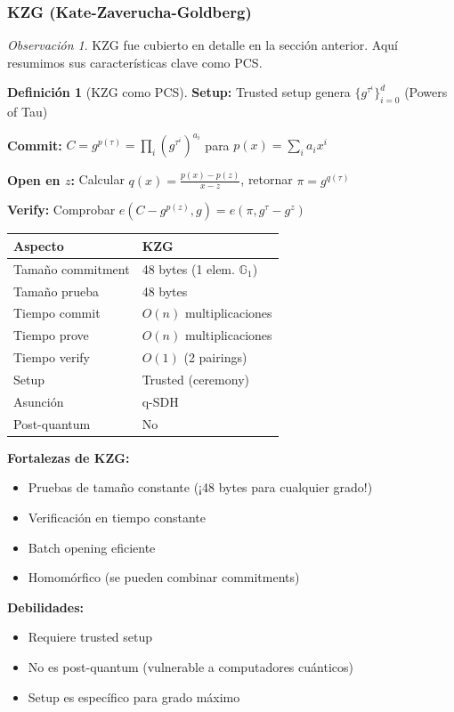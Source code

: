 \documentclass[11pt,a4paper,twoside,openright]{book}
\theoremstyle{definition}
\newtheorem{definition}{Definición}[chapter]
\theoremstyle{plain}
\theoremstyle{remark}
\newtheorem{remark}{Observación}[chapter]
\begin{document}
\subsubsection{KZG (Kate-Zaverucha-Goldberg)}

\begin{remark}
KZG fue cubierto en detalle en la sección anterior. Aquí resumimos sus características clave como PCS.
\end{remark}

\begin{definition}[KZG como PCS]
\textbf{Setup:} Trusted setup genera $\{g^{\tau^i}\}_{i=0}^d$ (Powers of Tau)

\textbf{Commit:} $C = g^{p(\tau)} = \prod_i (g^{\tau^i})^{a_i}$ para $p(x) = \sum_i a_i x^i$

\textbf{Open en $z$:} Calcular $q(x) = \frac{p(x) - p(z)}{x - z}$, retornar $\pi = g^{q(\tau)}$

\textbf{Verify:} Comprobar $e(C - g^{p(z)}, g) = e(\pi, g^\tau - g^z)$
\end{definition}

\begin{center}
\begin{tabular}{ll}
\toprule
\textbf{Aspecto} & \textbf{KZG} \\
\midrule
Tamaño commitment & 48 bytes (1 elem. $\mathbb{G}_1$) \\
Tamaño prueba & 48 bytes \\
Tiempo commit & $O(n)$ multiplicaciones \\
Tiempo prove & $O(n)$ multiplicaciones \\
Tiempo verify & $O(1)$ (2 pairings) \\
Setup & Trusted (ceremony) \\
Asunción & q-SDH \\
Post-quantum & No \\
\bottomrule
\end{tabular}
\end{center}

\begin{keyidea}
\textbf{Fortalezas de KZG:}
\begin{itemize}
    \item Pruebas de tamaño constante (¡48 bytes para cualquier grado!)
    \item Verificación en tiempo constante
    \item Batch opening eficiente
    \item Homomórfico (se pueden combinar commitments)
\end{itemize}

\textbf{Debilidades:}
\begin{itemize}
    \item Requiere trusted setup
    \item No es post-quantum (vulnerable a computadores cuánticos)
    \item Setup es específico para grado máximo
\end{itemize}
\end{keyidea}
\end{document}
